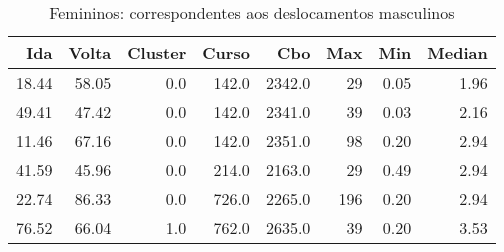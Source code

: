 \begin{table}
\centering
\caption{Femininos: correspondentes aos deslocamentos masculinos}
\label{tab:Salarios_Desequlibrio_F}
\begin{tabular}{rrrrrrrr}
\toprule
  Ida &  Volta &  Cluster &  Curso &    Cbo &  Max &  Min &  Median \\
\midrule
18.44 &  58.05 &      0.0 &  142.0 & 2342.0 &   29 & 0.05 &    1.96 \\
49.41 &  47.42 &      0.0 &  142.0 & 2341.0 &   39 & 0.03 &    2.16 \\
11.46 &  67.16 &      0.0 &  142.0 & 2351.0 &   98 & 0.20 &    2.94 \\
41.59 &  45.96 &      0.0 &  214.0 & 2163.0 &   29 & 0.49 &    2.94 \\
22.74 &  86.33 &      0.0 &  726.0 & 2265.0 &  196 & 0.20 &    2.94 \\
76.52 &  66.04 &      1.0 &  762.0 & 2635.0 &   39 & 0.20 &    3.53 \\
\bottomrule
\end{tabular}
\end{table}
